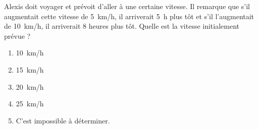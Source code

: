 Alexis doit voyager et prévoit d'aller à une certaine vitesse. Il remarque que s'il augmentait cette vitesse de 5~km/h, il arriverait  5~h plus tôt et s'il l'augmentait de 10~km/h, il arriverait 8 heures plus tôt. Quelle est la vitesse initialement prévue ?
\begin{multicols}{5}
  \begin{enumerate}[A/]
    \item 10~km/h
    \item 15~km/h
    \item 20~km/h
    \item 25~km/h
    \item C'est impossible à déterminer.
  \end{enumerate}
\end{multicols}